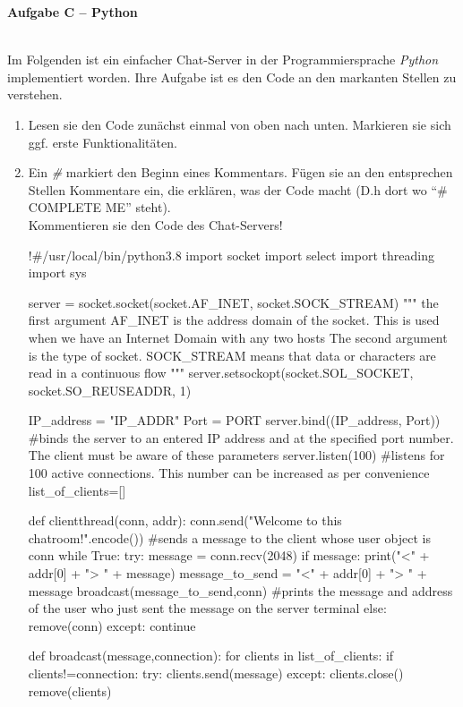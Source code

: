 \documentclass[paper=a4,fontsize=11pt]{scrartcl}%
\numberwithin{equation}{section}
\begin{document}
\begin{center}\Large{\textbf{Aufgabe C -- Python}}\end{center}
~\\
Im Folgenden ist ein einfacher Chat-Server in der Programmiersprache \emph{Python} implementiert worden. Ihre Aufgabe ist es den Code an den markanten Stellen zu verstehen.
\begin{enumerate}
	\item Lesen sie den Code zunächst einmal von oben nach unten. Markieren sie sich ggf. erste Funktionalitäten.
	\item Ein \emph{\#} markiert den Beginn eines Kommentars. Fügen sie an den entsprechen Stellen Kommentare ein, die erklären, was der Code macht (D.h dort wo \enquote{\# COMPLETE ME} steht).\\
	Kommentieren sie den Code des Chat-Servers!
\begin{python}
!#/usr/local/bin/python3.8
import socket
import select
import threading
import sys


server = socket.socket(socket.AF_INET, socket.SOCK_STREAM)
"""
the first argument AF_INET is the address domain of the socket. This is used when we have an Internet Domain
with any two hosts
The second argument is the type of socket. SOCK_STREAM means that data or characters are read in a continuous flow
"""
server.setsockopt(socket.SOL_SOCKET, socket.SO_REUSEADDR, 1)

IP_address = "IP_ADDR"
Port = PORT
server.bind((IP_address, Port)) 
#binds the server to an entered IP address and at the specified port number. The client must be aware of these parameters
server.listen(100)
#listens for 100 active connections. This number can be increased as per convenience
list_of_clients=[]

def clientthread(conn, addr):
    conn.send("Welcome to this chatroom!".encode())
    #sends a message to the client whose user object is conn
    while True:
            try:     
                message = conn.recv(2048)    
                if message:
                    print("<" + addr[0] + "> " + message)
                    message_to_send = "<" + addr[0] + "> " + message
                    broadcast(message_to_send,conn)
                    #prints the message and address of the user who just sent the message on the server terminal
                else:
                    remove(conn)
            except:
                continue

def broadcast(message,connection):
    for clients in list_of_clients:
        if clients!=connection:
            try:
                clients.send(message)
            except:
                clients.close()
                remove(clients)


\end{python}
\end{enumerate}
\end{document}
